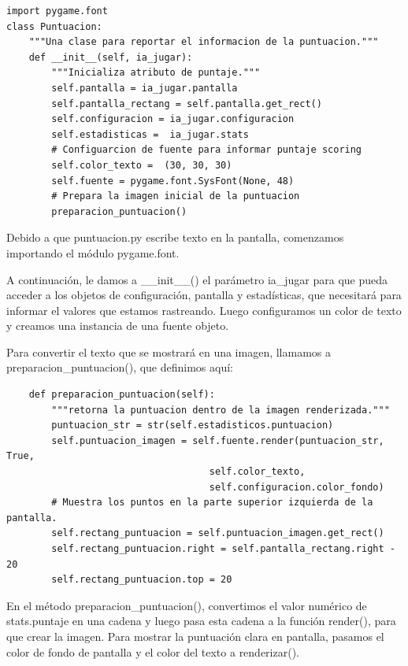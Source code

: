 \hspace{-2.9cm}{\ttfamily \scriptsize puntuacion.py}  \vspace{-0.5cm}
\begin{lstlisting}
import pygame.font
class Puntuacion: 
    """Una clase para reportar el informacion de la puntuacion."""
    def __init__(self, ia_jugar): 
        """Inicializa atributo de puntaje.""" 
        self.pantalla = ia_jugar.pantalla
        self.pantalla_rectang = self.pantalla.get_rect() 
        self.configuracion = ia_jugar.configuracion 
        self.estadisticas =  ia_jugar.stats 
        # Configuarcion de fuente para informar puntaje scoring
        self.color_texto =  (30, 30, 30) 
        self.fuente = pygame.font.SysFont(None, 48)
        # Prepara la imagen inicial de la puntuacion
        preparacion_puntuacion()
\end{lstlisting}

Debido a que {\ttfamily puntuacion.py} escribe texto en la pantalla, comenzamos importando el
módulo {\ttfamily pygame.font}. 

A continuación, le damos a {\ttfamily \_\_init\_\_()} el parámetro {\ttfamily ia\_jugar} para que pueda
acceder a los objetos de configuración, pantalla y estadísticas, que necesitará para informar el
valores que estamos rastreando. Luego configuramos un color de texto y creamos una instancia de una fuente
objeto.

Para convertir el texto que se mostrará en una imagen, llamamos a {\ttfamily preparacion\_puntuacion()},
que definimos aquí:

\hspace{-2.9cm}{\ttfamily \scriptsize puntuacion.py}  \vspace{-0.5cm}
\begin{lstlisting}		
    def preparacion_puntuacion(self):
        """retorna la puntuacion dentro de la imagen renderizada."""
        puntuacion_str = str(self.estadisticos.puntuacion)
        self.puntuacion_imagen = self.fuente.render(puntuacion_str, True,
                                    self.color_texto, 
                                    self.configuracion.color_fondo)
        # Muestra los puntos en la parte superior izquierda de la pantalla.
        self.rectang_puntuacion = self.puntuacion_imagen.get_rect()
        self.rectang_puntuacion.right = self.pantalla_rectang.right - 20
        self.rectang_puntuacion.top = 20
\end{lstlisting}


En el método {\ttfamily preparacion\_puntuacion()}, convertimos el valor numérico de {\ttfamily stats.puntaje} en una cadena
y luego pasa esta cadena a  la función {\ttfamily render()}, para que crear la imagen.
Para mostrar la puntuación clara en pantalla, pasamos el color de fondo de pantalla y el color del texto a {\ttfamily renderizar()}.

